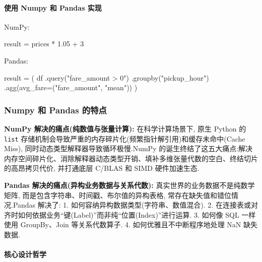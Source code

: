 \documentclass[11pt]{article}
\newenvironment{Shaded}{}{}
\newcommand{\DecValTok}[1]{\textcolor[rgb]{0.25,0.63,0.44}{{#1}}}
\newcommand{\FloatTok}[1]{\textcolor[rgb]{0.25,0.63,0.44}{{#1}}}
\newcommand{\StringTok}[1]{\textcolor[rgb]{0.25,0.44,0.63}{{#1}}}
\newcommand{\NormalTok}[1]{{#1}}
\newcommand{\OperatorTok}[1]{\textcolor[rgb]{0.40,0.40,0.40}{{#1}}}
\begin{document}
\paragraph{使用 Numpy 和 Pandas
实现}\label{ux4f7fux7528-numpy-ux548c-pandas-ux5b9eux73b0}

NumPy:

\begin{Shaded}
\begin{Highlighting}[]
\NormalTok{result }\OperatorTok{=}\NormalTok{ prices }\OperatorTok{*} \FloatTok{1.05} \OperatorTok{+} \DecValTok{3}
\end{Highlighting}
\end{Shaded}

Pandas:

\begin{Shaded}
\begin{Highlighting}[]
\NormalTok{result }\OperatorTok{=}\NormalTok{ (}
\NormalTok{    df}
\NormalTok{    .query(}\StringTok{"fare\_amount \textgreater{} 0"}\NormalTok{)}
\NormalTok{    .groupby(}\StringTok{"pickup\_hour"}\NormalTok{)}
\NormalTok{    .agg(avg\_fare}\OperatorTok{=}\NormalTok{(}\StringTok{"fare\_amount"}\NormalTok{, }\StringTok{"mean"}\NormalTok{))}
\NormalTok{)}
\end{Highlighting}
\end{Shaded}

\subsubsection{Numpy 和 Pandas
的特点}\label{numpy-ux548c-pandas-ux7684ux7279ux70b9}

\textbf{NumPy 解决的痛点(纯数值与张量计算):} 在科学计算场景下, 原生
Python 的 \texttt{list}
存储机制会导致严重的内存碎片化(频繁指针解引用)和缓存未命中(Cache Miss),
同时动态类型解释器导致循环极慢.NumPy
的诞生终结了这五大痛点:解决内存空间碎片化、消除解释器动态类型开销、填补多维张量代数的空白、终结切片的高昂拷贝代价,
并打通底层 C/BLAS 和 SIMD 硬件加速生态.

\textbf{Pandas 解决的痛点(异构业务数据与关系代数):}
真实世界的业务数据不是纯数学矩阵,
而是包含字符串、时间戳、布尔值的异构表格, 常存在缺失值和错位情况.Pandas
解决了: 1. 如何容纳异构数据类型(字符串、数值混合). 2.
在连接表或对齐时如何依据业务``键(Label)''而非纯``位置(Index)''进行运算.
3. 如何像 SQL 一样使用 GroupBy、Join 等关系代数算子. 4.
如何优雅且不中断程序地处理 NaN 缺失数据.

\paragraph{核心设计哲学}\label{ux6838ux5fc3ux8bbeux8ba1ux54f2ux5b66}
\end{document}
